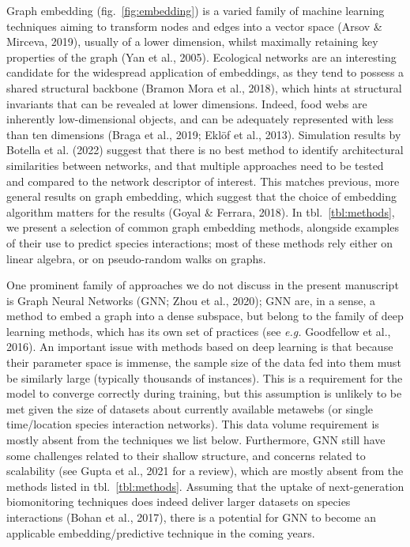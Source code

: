 \documentclass[10pt,oneside]{article}
\begin{document}
Graph embedding (fig.~\ref{fig:embedding}) is a varied family of machine
learning techniques aiming to transform nodes and edges into a vector
space (Arsov \& Mirceva, 2019), usually of a lower dimension, whilst
maximally retaining key properties of the graph (Yan et al., 2005).
Ecological networks are an interesting candidate for the widespread
application of embeddings, as they tend to possess a shared structural
backbone (Bramon Mora et al., 2018), which hints at structural
invariants that can be revealed at lower dimensions. Indeed, food webs
are inherently low-dimensional objects, and can be adequately
represented with less than ten dimensions (Braga et al., 2019; Eklöf et
al., 2013). Simulation results by Botella et al. (2022) suggest that
there is no best method to identify architectural similarities between
networks, and that multiple approaches need to be tested and compared to
the network descriptor of interest. This matches previous, more general
results on graph embedding, which suggest that the choice of embedding
algorithm matters for the results (Goyal \& Ferrara, 2018). In
tbl.~\ref{tbl:methods}, we present a selection of common graph embedding
methods, alongside examples of their use to predict species
interactions; most of these methods rely either on linear algebra, or on
pseudo-random walks on graphs.

One prominent family of approaches we do not discuss in the present
manuscript is Graph Neural Networks (GNN; Zhou et al., 2020); GNN are,
in a sense, a method to embed a graph into a dense subspace, but belong
to the family of deep learning methods, which has its own set of
practices (see \emph{e.g.} Goodfellow et al., 2016). An important issue
with methods based on deep learning is that because their parameter
space is immense, the sample size of the data fed into them must be
similarly large (typically thousands of instances). This is a
requirement for the model to converge correctly during training, but
this assumption is unlikely to be met given the size of datasets about
currently available metawebs (or single time/location species
interaction networks). This data volume requirement is mostly absent
from the techniques we list below. Furthermore, GNN still have some
challenges related to their shallow structure, and concerns related to
scalability (see Gupta et al., 2021 for a review), which are mostly
absent from the methods listed in tbl.~\ref{tbl:methods}. Assuming that
the uptake of next-generation biomonitoring techniques does indeed
deliver larger datasets on species interactions (Bohan et al., 2017),
there is a potential for GNN to become an applicable
embedding/predictive technique in the coming years.
\end{document}
